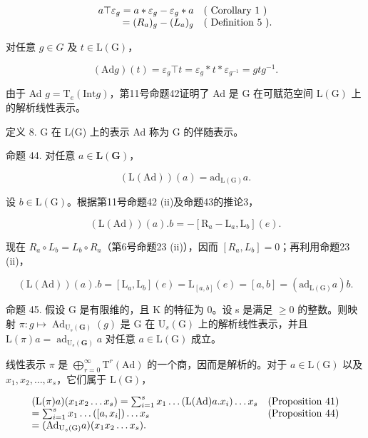 \[
\begin{array}{r l} a \top \varepsilon_ {g} = a * \varepsilon_ {g} - \varepsilon_ {g} * a & (\text { Corollary   1 }) \\ = (R _ {a}) _ {g} - (L _ {a}) _ {g} & (\text { Definition   5 }). \end{array}
\]

对任意 \(g \in G\) 及 \(t \in \mathrm{L}(\mathrm{G})\)，

\[
(\mathrm{Ad} g) (t) = \varepsilon_ {g} \top t = \varepsilon_ {g} * t * \varepsilon_ {g ^ {- 1}} = g t g ^ {- 1}.\tag{25}
\]

由于 Ad \(g = \mathrm{T}_{e}(\mathrm{Int} g)\)，第11号命题42证明了 Ad 是 G 在可赋范空间 \(\mathrm{L}(\mathrm{G})\) 上的解析线性表示。

定义 8. G 在 L(G) 上的表示 Ad 称为 G 的伴随表示。

命题 44. 对任意 \(a \in \mathbf{L}(\mathbf{G})\)，

\[
(\mathrm{L} (\mathrm{Ad})) (a) = \mathrm{ad} _ {\mathrm{L} (\mathrm{G})} a.
\]

设 \(b \in \mathrm{L}(\mathrm{G})\)。根据第11号命题42 (ii)及命题43的推论3，

\[
(\mathrm{L} (\mathrm{Ad})) (a). b = - [ \mathrm{R} _ {a} - \mathrm{L} _ {a}, \mathrm{L} _ {b} ] (e).
\]

现在 \(R_{a} \circ L_{b} = L_{b} \circ R_{a}\)（第6号命题23 (ii)），因而 \([R_{a}, L_{b}] = 0\)；再利用命题23 (ii)，

\[
(\mathrm{L} (\mathrm{Ad})) (a). b = [ \mathrm{L} _ {a}, \mathrm{L} _ {b} ] (e) = \mathrm{L} _ {[ a, b ]} (e) = [ a, b ] = (\mathrm{ad} _ {\mathrm{L} (\mathrm{G})} a) b.
\]

命题 45. 假设 G 是有限维的，且 K 的特征为 0。设 s 是满足 \(\geqslant0\) 的整数。则映射 \(\pi: g \mapsto \operatorname{Ad}_{\mathrm{U}_{s}(\mathbf{G})}(g)\) 是 G 在 \(\mathrm{U}_{s}(\mathrm{G})\) 上的解析线性表示，并且 \(\mathrm{L}(\pi)a = \operatorname{ad}_{\mathrm{U}_{s}(\mathbf{G})}a\) 对任意 \(a \in \mathrm{L}(\mathrm{G})\) 成立。

线性表示 \(\pi\) 是 \(\bigoplus_{r=0}^{\infty} \mathrm{T}^{r}(\mathrm{Ad})\) 的一个商，因而是解析的。对于 \(a \in \mathrm{L}(\mathrm{G})\) 以及 \(x_{1}, x_{2}, \ldots, x_{s}\)，它们属于 \(\mathrm{L}(\mathrm{G})\)，

\[
\begin{array}{l l} (\mathrm{L} (\pi) a) (x _ {1} x _ {2} \dots x _ {s}) = \sum_ {i = 1} ^ {s} x _ {1} \dots (\mathrm{L} (\mathrm{Ad}) a. x _ {i}) \dots x _ {s} & \text {(Proposition 41)} \\ = \sum_ {i = 1} ^ {s} x _ {1} \dots ([ a, x _ {i} ]) \dots x _ {s} & \text {(Proposition 44)} \\ = (\mathrm{Ad} _ {\mathrm{U} _ {s} (\mathrm{G})} a) (x _ {1} x _ {2} \dots x _ {s}). \end{array}
\]


